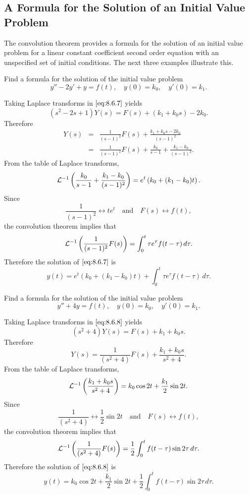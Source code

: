 \documentclass{ximera}
\begin{document}
\subsection*{A Formula for the Solution of an Initial Value Problem}

The convolution theorem provides a formula for the
solution of an initial value problem for a linear constant coefficient
second order equation with an unspecified set of initial conditions.
The next three examples illustrate this.

\begin{example}\label{example:8.6.2}
 Find a formula for the solution of the initial value problem
\begin{equation}\label{eq:8.6.7}
y''-2y'+y=f(t),\quad  y(0)=k_0,\quad y'(0)=k_1.
\end{equation}
\begin{explanation}
Taking Laplace transforms in $\eqref{eq:8.6.7}$ yields
$$
(s^2-2s+1)Y(s)=F(s)+(k_1+k_0s)-2k_0.
$$
Therefore
\begin{eqnarray*}
Y(s)&=&\frac{1}{(s-1)^2}F(s)+\frac{k_1+k_0s-2k_0}{(s-1)^2}\\
&=&\frac{1}{(s-1)^2}F(s)+\frac{k_0}{s-1}+\frac{k_1-k_0}{(s-1)^2}.
\end{eqnarray*}
From the table of Laplace transforms,
$$
{\cal L}^{-1}\left(\frac{k_0}{s-1}+\frac{k_1-k_0}{(s-1)^2}\right)
=e^t\left(k_0+(k_1-k_0)t\right).
$$
Since
$$
\frac{1}{(s-1)^2}\leftrightarrow te^t\quad\mbox{and}\quad F(s)
\leftrightarrow f(t),
$$
the convolution theorem implies that
$$
{\cal L}^{-1}
\left(\frac{1}{(s-1)^2}F(s)\right)=
\int_0^t\tau e^\tau f(t-\tau)\,d\tau.
$$
Therefore the solution of  $\eqref{eq:8.6.7}$ is
$$
y(t)=e^t\left(k_0+(k_1-k_0)t\right)+\int_0^t\tau e^\tau f(t-\tau)\,
d\tau.
$$
\end{explanation}
\end{example}

\begin{example}\label{example:8.6.3}
 Find a formula for the solution of the initial value problem
\begin{equation}\label{eq:8.6.8}
y''+4y=f(t),\quad y(0)=k_0,\quad y'(0)=k_1.
\end{equation}
\begin{explanation}
Taking Laplace transforms in $\eqref{eq:8.6.8}$ yields
$$
(s^2+4)Y(s) =F(s)+k_1+k_0s.
$$
Therefore
$$
Y(s) =\frac{1}{(s^2+4)}F(s)+\frac{k_1+k_0s}{s^2+4}.
$$
From the table of Laplace transforms,
$$
{\cal L}^{-1}\left(\frac{k_1+k_0s}{s^2+4}\right)=k_0\cos 2t+\frac{k_1}{2}\sin 2t.
$$
Since
$$
\frac{1}{(s^2+4)}\leftrightarrow \frac{1}{2}\sin 2t\quad\mbox{and}\quad
F(s)\leftrightarrow f(t),
$$
the convolution theorem implies that
$$
{\cal L}^{-1}\left(\frac{1}{(s^2+4)}F(s)\right)=
 \frac{1}{2}\int_0^t  f(t-\tau)\sin 2\tau\,
d\tau.
$$
Therefore the solution of  $\eqref{eq:8.6.8}$ is
$$
y(t)=k_0\cos 2t+\frac{k_1}{2}\sin 2t+\frac{1}{2}\int_0^tf(t-\tau)\sin
2\tau\,d\tau.
$$
\end{explanation}
\end{example}
\end{document}
